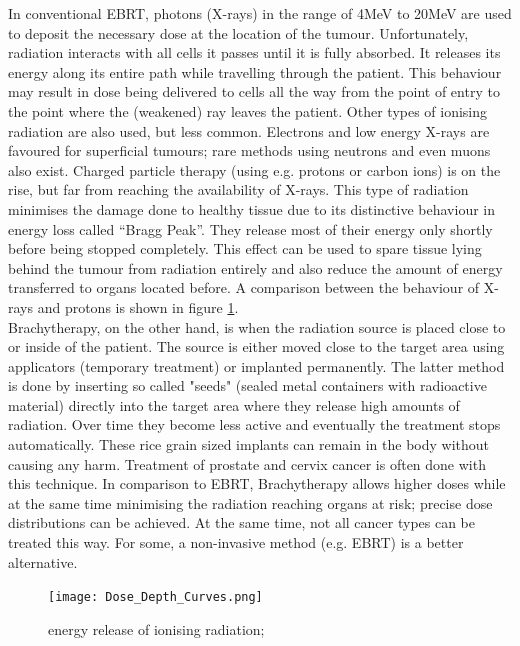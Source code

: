 In conventional EBRT, photons (X-rays) in the range of 4MeV to 20MeV are used to deposit the necessary dose at the location of the tumour.
Unfortunately, radiation interacts with all cells it passes until it is fully absorbed.
It releases its energy along its entire path while travelling through the patient.
This behaviour may result in dose being delivered to cells all the way from the point of entry to the point where the (weakened) ray leaves the patient.
Other types of ionising radiation are also used, but less common.
Electrons and low energy X-rays are favoured for superficial tumours; rare methods using neutrons and even muons also exist.
Charged particle therapy (using e.g. protons or carbon ions) is on the rise, but far from reaching the availability of X-rays.
This type of radiation minimises the damage done to healthy tissue due to its distinctive behaviour in energy loss called ``Bragg Peak''.
They release most of their energy only shortly before being stopped completely.
\cite{Nakamura2010} This effect can be used to spare tissue lying behind the tumour from radiation entirely and also reduce the amount of energy transferred to organs located before. \cite{Paganetti2005}
A comparison between the behaviour of X-rays and protons is shown in figure \ref{fig:bragg}.\\

Brachytherapy, on the other hand, is when the radiation source is placed close to or inside of the patient.
The source is either moved close to the target area using applicators (temporary treatment) or implanted permanently.
The latter method is done by inserting so called "seeds" (sealed metal containers with radioactive material) directly into the target area where they release high amounts of radiation.
Over time they become less active and eventually the treatment stops automatically.
These rice grain sized implants can remain in the body without causing any harm.
Treatment of prostate and cervix cancer is often done with this technique.
In comparison to EBRT, Brachytherapy allows higher doses while at the same time minimising the radiation reaching organs at risk; precise dose distributions can be achieved.
At the same time, not all cancer types can be treated this way.
For some, a non-invasive method (e.g. EBRT) is a better alternative.\\


\begin{figure}[!h]
	\centering
	\texttt{[image: Dose\_Depth\_Curves.png]}
	\caption{energy release of ionising radiation; \cite{Cepheiden}}
	\label{fig:bragg}
\end{figure}

